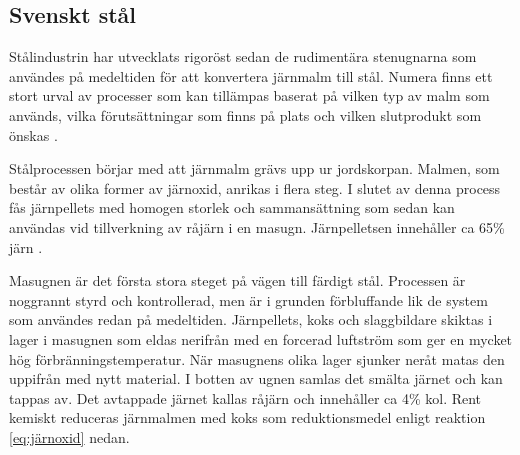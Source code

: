  


\subsection{Svenskt stål}

Stålindustrin har utvecklats rigoröst sedan de rudimentära stenugnarna som användes på medeltiden för att konvertera järnmalm till stål. Numera finns ett stort urval av processer som kan tillämpas baserat på vilken typ av malm som används, vilka förutsättningar som finns på plats och vilken slutprodukt som önskas \cite{Pehlke2014a}.

Stålprocessen börjar med att järnmalm grävs upp ur jordskorpan. Malmen, som består av olika former av järnoxid, anrikas i flera steg. I slutet av denna process fås järnpellets med homogen storlek och sammansättning som sedan kan användas vid tillverkning av råjärn i en masugn. Järnpelletsen innehåller ca 65\% järn \cite{RobertVikman}.

Masugnen är det första stora steget på vägen till färdigt stål. Processen är noggrannt styrd och kontrollerad, men är i grunden förbluffande lik de system som användes redan på medeltiden. Järnpellets, koks och slaggbildare skiktas i lager i masugnen som eldas nerifrån med en forcerad luftström som ger en mycket hög förbränningstemperatur. När masugnens olika lager sjunker neråt matas den uppifrån med nytt material. I botten av ugnen samlas det smälta järnet och kan tappas av. Det avtappade järnet kallas råjärn och innehåller ca 4\% kol. Rent kemiskt reduceras järnmalmen med koks som reduktionsmedel enligt reaktion \eqref{eq:järnoxid} nedan.

